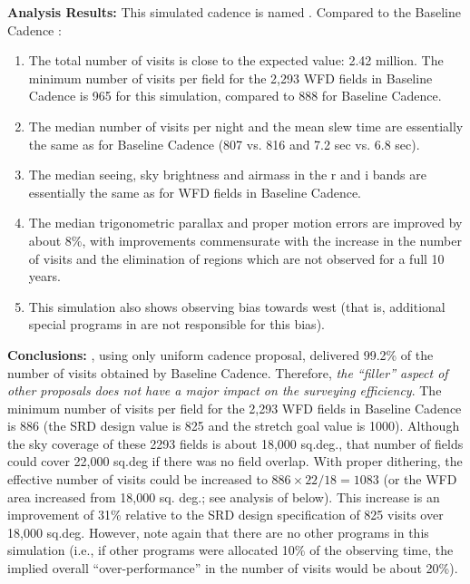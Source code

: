 {\bf Analysis Results:} This simulated cadence is named .
Compared to the Baseline Cadence :
\begin{enumerate}
\item The total number of visits is close to the expected value: 2.42
  million.  The minimum number of visits per field for the 2,293 WFD
  fields in Baseline Cadence is 965 for this simulation, compared to
  888 for Baseline Cadence.
\item The median number of visits per night and the mean slew time are
  essentially the same as for Baseline Cadence (807 vs. 816 and 7.2
  sec vs. 6.8 sec).
\item The median seeing, sky brightness and airmass in the r and i bands are
      essentially the same as for WFD fields in Baseline Cadence.
\item The median trigonometric parallax and proper motion errors are
  improved by about 8\%, with improvements commensurate with the
  increase in the number of visits and the elimination of regions
  which are not observed for a full 10 years.
\item This simulation also shows observing bias towards west (that is,
  additional special programs in  are not
  responsible for this bias).
\end{enumerate}


{\bf Conclusions:} , using only uniform cadence
proposal, delivered 99.2\% of the number of visits obtained by
Baseline Cadence. Therefore, {\it the ``filler'' aspect of other
proposals does not have a major impact on the surveying efficiency}.
The minimum number of visits per field for the 2,293 WFD fields in
Baseline Cadence is 886 (the SRD design value is 825 and the stretch
goal value is 1000). Although the sky coverage of these 2293 fields is
about 18,000 sq.deg., that number of fields could cover 22,000 sq.deg if there was no field overlap. With
proper dithering, the effective number of visits could be increased to
$886\times22/18 = 1083$ (or the WFD area increased from 18,000 sq. deg.; see
analysis of  below). This increase is an improvement of 31\%
relative to the SRD design specification of 825 visits over 18,000
sq.deg. However, note again that there are no other programs in this
simulation (i.e., if other programs were allocated 10\% of the
observing time, the implied overall ``over-performance'' in the number
of  visits would be about 20\%).


